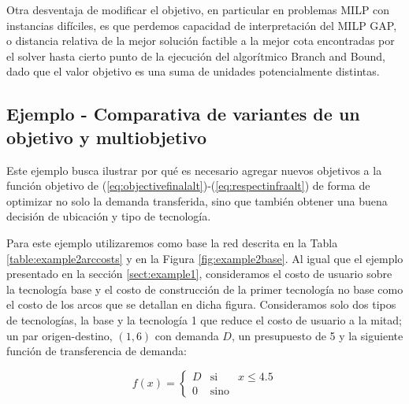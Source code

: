 Otra desventaja de modificar el objetivo, en particular en problemas MILP con instancias difíciles, es que perdemos capacidad de interpretación del MILP GAP, o distancia relativa de la mejor solución factible a la mejor cota encontradas por el solver hasta cierto punto de la ejecución del algorítmico Branch and Bound, dado que el valor objetivo es una suma de unidades potencialmente distintas.

\subsection{Ejemplo - Comparativa de variantes de un objetivo y multiobjetivo}
\label{sect:example2}

Este ejemplo busca ilustrar por qué es necesario agregar nuevos objetivos a la función objetivo de (\ref{eq:objectivefinalalt})-(\ref{eq:respectinfraalt}) de forma de optimizar no solo la demanda transferida, sino que también obtener una buena decisión de ubicación y tipo de tecnología.

Para este ejemplo utilizaremos como base la red descrita en la Tabla \ref{table:example2arccosts} y en la Figura \ref{fig:example2base}. Al igual que el ejemplo presentado en la sección \ref{sect:example1}, consideramos el costo de usuario sobre la tecnología base y el costo de construcción de la primer tecnología no base como el costo de los arcos que se detallan en dicha figura. Consideramos solo dos tipos de tecnologías, la base y la tecnología 1 que reduce el costo de usuario a la mitad; un par origen-destino, $(1, 6)$ con demanda $D$, un presupuesto de 5 y la siguiente función de transferencia de demanda:

$$
  f(x) = \left\{ \begin{array}{lcr}
          D & \mbox{si}   & x \leq 4.5 \\
          0 & \mbox{sino} &
        \end{array}
        \right.
$$

